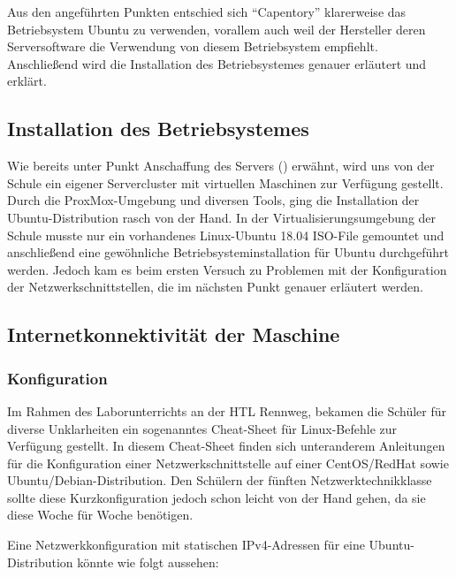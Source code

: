 Aus den angeführten Punkten entschied sich ``Capentory'' klarerweise das
Betriebsystem Ubuntu zu verwenden, vorallem auch weil der Hersteller
deren Serversoftware die Verwendung von diesem Betriebsystem empfiehlt.
Anschließend wird die Installation des Betriebsystemes genauer erläutert
und erklärt.

\hypertarget{installation-des-betriebsystemes}{%
\subsection{Installation des
Betriebsystemes}\label{installation-des-betriebsystemes}}

Wie bereits unter Punkt Anschaffung des Servers
() erwähnt, wird uns von der Schule ein
eigener Servercluster mit virtuellen Maschinen zur Verfügung gestellt.
Durch die ProxMox-Umgebung und diversen Tools, ging die Installation der
Ubuntu-Distribution rasch von der Hand. In der Virtualisierungsumgebung
der Schule musste nur ein vorhandenes Linux-Ubuntu 18.04 ISO-File
gemountet und anschließend eine gewöhnliche Betriebsysteminstallation
für Ubuntu durchgeführt werden. Jedoch kam es beim ersten Versuch zu
Problemen mit der Konfiguration der Netzwerkschnittstellen, die im
nächsten Punkt genauer erläutert werden.

\hypertarget{internetkonnektivituxe4t-der-maschine}{%
\subsection{Internetkonnektivität der
Maschine}\label{internetkonnektivituxe4t-der-maschine}}

\hypertarget{konfiguration}{%
\subsubsection{Konfiguration}\label{konfiguration}}

Im Rahmen des Laborunterrichts an der HTL Rennweg, bekamen die Schüler
für diverse Unklarheiten ein sogenanntes Cheat-Sheet \cite{cheat} für
Linux-Befehle zur Verfügung gestellt. In diesem Cheat-Sheet finden sich
unteranderem Anleitungen für die Konfiguration einer
Netzwerkschnittstelle auf einer CentOS/RedHat sowie
Ubuntu/Debian-Distribution. Den Schülern der fünften
Netzwerktechnikklasse sollte diese Kurzkonfiguration jedoch schon leicht
von der Hand gehen, da sie diese Woche für Woche benötigen.

Eine Netzwerkkonfiguration mit statischen IPv4-Adressen für eine
Ubuntu-Distribution könnte wie folgt aussehen:

